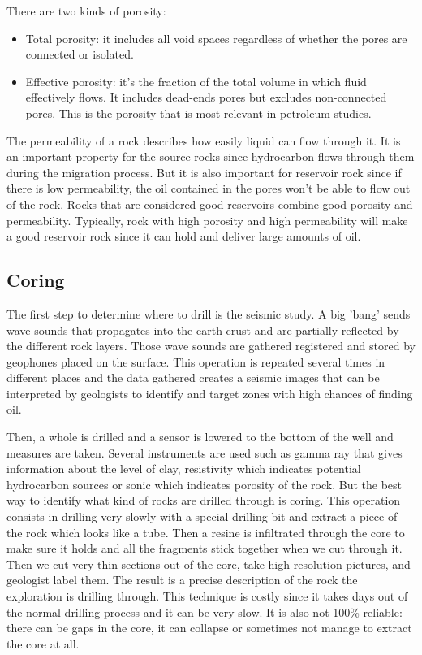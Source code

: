 There are two kinds of porosity:
\begin{itemize}
    \item Total porosity: it includes all void spaces regardless of whether the pores are connected or isolated.
    \item Effective porosity: it's the fraction of the total volume in which fluid effectively flows. It includes dead-ends pores but excludes non-connected pores. This is the porosity that is most relevant in petroleum studies. 
\end{itemize}

The permeability of a rock describes how easily liquid can flow through it. It is an important property for the source rocks since hydrocarbon flows through them during the migration process. But it is also important for reservoir rock since if there is low permeability, the oil contained in the pores won't be able to flow out of the rock. 
Rocks that are considered good reservoirs combine good porosity and permeability. Typically, rock with high porosity and high permeability will make a good reservoir rock since it can hold and deliver large amounts of oil. 


\subsection{Coring}\label{sec:coring}
The first step to determine where to drill is the seismic study. A big 'bang' sends wave sounds that propagates into the earth crust and are partially reflected by the different rock layers. Those wave sounds are gathered registered and stored by geophones placed on the surface. This operation is repeated several times in different places and the data gathered creates a seismic images that can be interpreted by geologists to identify and target zones with high chances of finding oil. 

Then, a whole is drilled and a sensor is lowered to the bottom of the well and measures are taken. Several instruments are used such as gamma ray that gives information about the level of clay, resistivity which indicates potential hydrocarbon sources or sonic which indicates porosity of the rock. But the best way to identify what kind of rocks are drilled through is coring. This operation consists in drilling very slowly with a special drilling bit and extract a piece of the rock which looks like a tube. Then a resine is infiltrated through the core to make sure it holds and all the fragments stick together when we cut through it. Then we cut very thin sections out of the core, take high resolution pictures, and geologist label them. The result is a precise description of the rock the exploration is drilling through.  
This technique is costly since it takes days out of the normal drilling process and it can be very slow. It is also not 100\% reliable: there can be gaps in the core, it can collapse or sometimes not manage to extract the core at all. 


